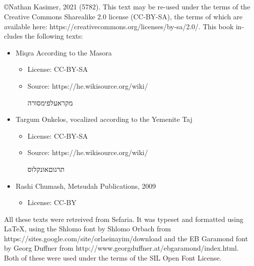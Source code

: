 \frontmatter
{}

\title{\texttitle\\
\engtext{\engtitle}
}

\author{}

\date{}

\maketitle

\begin{minipage}[b][\textheight][b]{\textwidth}\englishfont	
	\begin{english}
		\vfill
		©Nathan Kasimer, 2021 (5782). This text may be re-used under the terms of the Creative Commons Sharealike 2.0 license (CC-BY-SA), the terms of which are available here: https://creativecommons.org/licenses/by-sa/2.0/. This book includes the following texts:
		\begin{itemize}
			\item Miqra According to the Masora
			\begin{itemize}
				\item License: CC-BY-SA
				\item Source: https://he.wikisource.org/wiki/\hspace{-0.4em}\begin{hebrew}מקרא\textunderscore על\textunderscore פי\textunderscore מסורה\end{hebrew}
			\end{itemize}
			\item Targum Onkelos, vocalized according to the Yemenite Taj
			\begin{itemize}
				\item License: CC-BY-SA
				\item Source: https://he.wikisource.org/wiki/\hspace{-0.4em}\begin{hebrew}תרגום\textunderscore אונקלוס\end{hebrew}
			\end{itemize}
			\item Rashi Chumash, Metsudah Publications, 2009
			\begin{itemize}
				\item License: CC-BY
			\end{itemize}
		\end{itemize}
		All these texts were retreived from Sefaria.  It was typeset and formatted using \LaTeX , using the Shlomo font by Shlomo Orbach from https://sites.google.com/site/orlaeinayim/download and the EB Garamond font by Georg Duffner from http://www.georgduffner.at/ebgaramond/index.html. Both of these were used under the terms of the SIL Open Font License.
		\clearpage
		
	\end{english}
\end{minipage}

